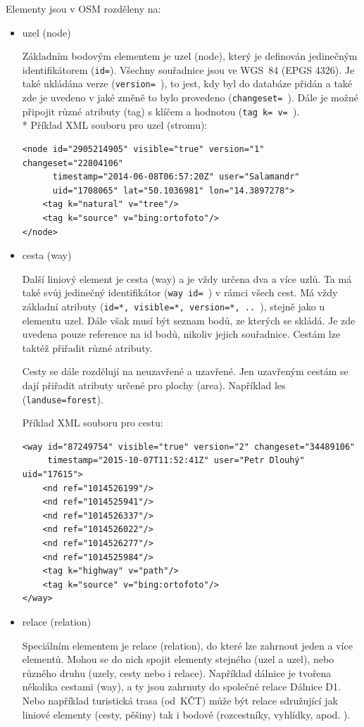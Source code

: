 Elementy jsou v OSM rozděleny na:
\begin{itemize}
    \item uzel (node) 

Základním bodovým elementem je uzel (node), který je definován jedinečným
identifikátorem ({\tt id=}). Všechny souřadnice jsou ve WGS~84 (EPGS 4326). 
Je také ukládána verze ({\tt version= }), to jest, kdy byl do databáze přidán
a také zde je uvedeno v jaké změně to bylo provedeno ({\tt changeset=~}).
Dále je možné připojit různé atributy (tag) s klíčem a hodnotou ({\tt tag~k=~v=~}).
\\*
Příklad XML souboru pro uzel (stromu):

{\scriptsize \begin{lstlisting}
<node id="2905214905" visible="true" version="1" changeset="22804106" 
      timestamp="2014-06-08T06:57:20Z" user="Salamandr" 
      uid="1708065" lat="50.1036981" lon="14.3897278">
    <tag k="natural" v="tree"/>
    <tag k="source" v="bing:ortofoto"/>
</node>
\end{lstlisting} }
    \item cesta (way)

Další liniový element je cesta (way) a je vždy určena dva a více uzlů.
Ta má také svůj jedinečný identifikátor ({\tt way~id=~}) v rámci všech cest.
Má vždy základní atributy ({\tt id=*, visible=*, version=*, .. }), 
stejně jako u elementu uzel.
Dále však musí být seznam bodů, ze kterých se skládá.
Je zde uvedena pouze reference na id bodů, nikoliv jejich souřadnice.
Cestám lze taktéž přiřadit různé atributy.

Cesty se dále rozdělují na neuzavřené a uzavřené.
Jen uzavřeným cestám se dají přiřadit atributy určené pro plochy (area).
Například les ({\tt landuse=forest}).

Příklad XML souboru pro cestu:

{\scriptsize
\begin{lstlisting}
<way id="87249754" visible="true" version="2" changeset="34489106"
     timestamp="2015-10-07T11:52:41Z" user="Petr Dlouhý" uid="17615">
    <nd ref="1014526199"/>
    <nd ref="1014525941"/>
    <nd ref="1014526337"/>
    <nd ref="1014526022"/>
    <nd ref="1014526277"/>
    <nd ref="1014525984"/>
    <tag k="highway" v="path"/>
    <tag k="source" v="bing:ortofoto"/>
</way>
\end{lstlisting}
}
      
    \item relace (relation)

Speciálním elementem je relace (relation), do které lze zahrnout
jeden a více elementů. Mohou se do nich spojit elementy stejného (uzel a uzel),
nebo různého druhu (uzely, cesty nebo i relace). 
Například dálnice je tvořena několika cestami (way), a ty
jsou zahrnuty do společné relace Dálnice D1. Nebo například turistická trasa
(od~KČT) může být relace sdružující jak liniové elementy (cesty, pěšiny) tak i bodové
(rozcestníky, vyhlídky, apod. ).
\end{itemize}

